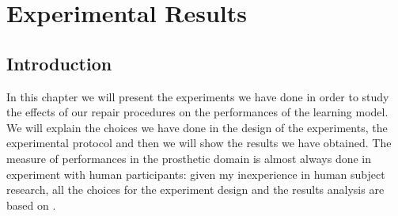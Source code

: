 \chapter{Experimental Results}\label{ch:exp-result}
\section{Introduction}\label{sec:exp-intro}
In this chapter we will present the experiments we have done in order to study the effects of our repair procedures on the performances of the learning model. We will explain the choices we have done in the design of the experiments, the experimental protocol and then we will show the results we have obtained.
The measure of performances in the prosthetic domain is almost always done in experiment with human participants: given my inexperience in human subject research, all the choices for the experiment design and the results analysis are based on \cite{de2017human}.
%
%
%
%
%
